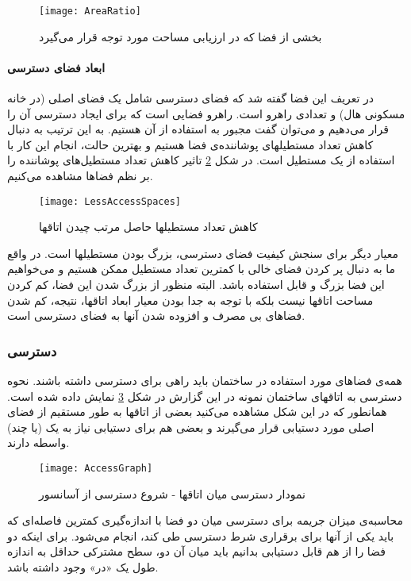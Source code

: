 \documentclass{report}
\begin{document}
\begin{figure} \centerline{\texttt{[image: AreaRatio]}} \caption{\label{fAreaRatio}
بخشی از فضا که در ارزیابی مساحت مورد توجه قرار می‌گیرد
 } \end{figure}

\paragraph{ابعاد فضای دسترسی}
در تعریف این فضا گفته شد که فضای دسترسی شامل یک فضای اصلی (در خانه مسکونی هال) و تعدادی راهرو است. راهرو فضایی است که برای ایجاد دسترسی آن را قرار می‌دهیم و می‌توان گفت مجبور به استفاده از آن هستیم. به این ترتیب به دنبال کاهش تعداد مستطیلهای پوشاننده‌ی فضا هستیم و بهترین حالت، انجام این کار با استفاده از یک مستطیل است. در شکل \ref{fLessAccessSpaces} تاثیر کاهش تعداد مستطیل‌های پوشاننده را بر نظم فضاها مشاهده می‌کنیم.

\begin{figure}[!h] \centerline{\texttt{[image: LessAccessSpaces]}} \caption{\label{fLessAccessSpaces}
کاهش تعداد مستطیلها حاصل مرتب چیدن اتاقها
 } \end{figure}

 معیار دیگر برای سنجش کیفیت فضای دسترسی، بزرگ بودن مستطیلها است. در واقع ما به دنبال پر کردن فضای خالی با کمترین تعداد مستطیل ممکن هستیم و می‌خواهیم این فضا بزرگ و قابل استفاده باشد. البته منظور از بزرگ شدن این فضا، کم کردن مساحت اتاقها نیست بلکه با توجه به جدا بودن معیار ابعاد اتاقها، نتیجه، کم شدن فضاهای بی مصرف و افزوده شدن آنها به فضای دسترسی است. 

\subsubsection{دسترسی}
همه‌ی فضاهای مورد استفاده در ساختمان باید راهی برای دسترسی داشته باشند. نحوه دسترسی به اتاقهای ساختمان نمونه در این گزارش در شکل \ref{fAccessGraph} نمایش داده شده است. همانطور که در این شکل مشاهده می‌کنید بعضی از اتاقها به طور مستقیم از فضای اصلی مورد دستیابی قرار می‌گیرند و بعضی هم برای دستیابی نیاز به یک (یا چند) واسطه دارند.

\begin{figure} \centerline{\texttt{[image: AccessGraph]}} \caption{\label{fAccessGraph}
نمودار دسترسی میان اتاقها - شروع دسترسی از آسانسور
 } \end{figure}

محاسبه‌ی میزان جریمه برای دسترسی میان دو فضا با اندازه‌گیری کمترین فاصله‌ای که باید یکی از آنها برای برقراری شرط دسترسی طی کند، انجام می‌شود. برای اینکه دو فضا را از هم قابل دستیابی بدانیم باید میان آن دو، سطح مشترکی حداقل به اندازه طول یک «در» وجود داشته باشد.
\end{document}
